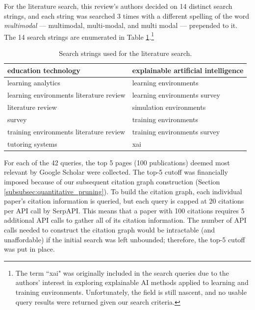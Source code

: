 \documentclass[manuscript,screen,review]{acmart}
\begin{document}
For the literature search, this review's authors decided on 14 distinct search strings, and each string was searched 3 times with a different spelling of the word \textit{multimodal} --- multimodal, multi-modal, and multi modal --- prepended to it. The 14 search strings are enumerated in Table \ref{tab:search_terms}.\footnote{The term ``xai" was originally included in the search queries due to the authors' interest in exploring explainable AI methods applied to learning and training environments. Unfortunately, the field is still nascent, and no usable query results were returned given our search criteria.}

\begin{table}[htbp]
    \renewcommand{\arraystretch}{1.3}%
    \centering
    \caption{Search strings used for the literature search.}
    \begin{tabularx}{\linewidth}{l@{\hskip .25in} l@{\hskip .25in}}
    
        \midrule
        education technology & explainable artificial intelligence \\

        \midrule
        learning analytics & learning environments \\
        
        \midrule
        learning environments literature review & learning environments survey \\
    
        \midrule
        literature review & simulation environments \\
        
        \midrule
        survey & training environments \\
        
        \midrule
        training environments literature review & training environments survey \\
        
        \midrule
        tutoring systems & xai \\

        \bottomrule
    \end{tabularx}
    \label{tab:search_terms}
\end{table}

For each of the 42 queries, the top 5 pages (100 publications) deemed most relevant by Google Scholar were collected. The top-5 cutoff was financially imposed because of our subsequent citation graph construction (Section \ref{subsubsec:quantitative_pruning}). To build the citation graph, each individual paper's citation information is queried, but each query is capped at 20 citations per API call by SerpAPI. This means that a paper with 100 citations requires 5 additional API calls to gather all of its citation information. The number of API calls needed to construct the citation graph would be intractable (and unaffordable) if the initial search was left unbounded; therefore, the top-5 cutoff was put in place.
\end{document}
